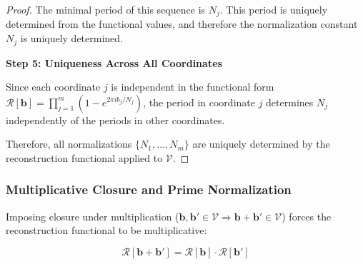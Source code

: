 \begin{proof}
The minimal period of this sequence is $N_j$. This period is uniquely determined from the functional values, and therefore the normalization constant $N_j$ is uniquely determined.

\noindent \textbf{Step 5: Uniqueness Across All Coordinates}

Since each coordinate $j$ is independent in the functional form $\mathcal{R}[\mathbf{b}] = \prod_{j=1}^m (1 - e^{2\pi i b_j / N_j})$, the period in coordinate $j$ determines $N_j$ independently of the periods in other coordinates.

Therefore, all normalizations $\{N_1, \ldots, N_m\}$ are uniquely determined by the reconstruction functional applied to $\mathcal{V}$.

\end{proof}

\subsubsection{Multiplicative Closure and Prime Normalization}
\label{subsubsec:natural-normalization}

Imposing closure under multiplication ($\mathbf{b}, \mathbf{b}' \in \mathcal{V} \Rightarrow \mathbf{b} + \mathbf{b}' \in \mathcal{V}$) forces the reconstruction functional to be multiplicative:

\begin{equation}
\label{eq:multiplicative-constraint}
\mathcal{R}[\mathbf{b} + \mathbf{b}'] = \mathcal{R}[\mathbf{b}] \cdot \mathcal{R}[\mathbf{b}']
\end{equation}

